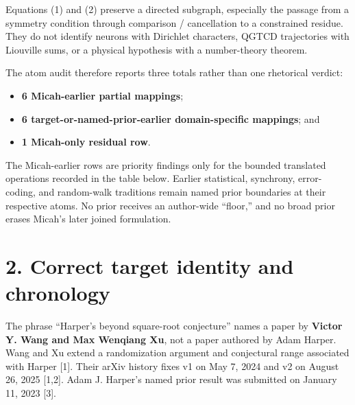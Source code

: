 \documentclass[
  american,
  11pt,
  letterpaper,
]{article}
\providecommand{\tightlist}{%
  \setlength{\itemsep}{0pt}\setlength{\parskip}{0pt}}
\begin{document}
Equations (1) and (2) preserve a directed subgraph, especially the passage from a symmetry condition through comparison / cancellation to a constrained residue. They do not identify neurons with Dirichlet characters, QGTCD trajectories with Liouville sums, or a physical hypothesis with a number-theory theorem.

The atom audit therefore reports three totals rather than one rhetorical verdict:

\begin{itemize}
\tightlist
\item
  \textbf{6 Micah-earlier partial mappings};
\item
  \textbf{6 target-or-named-prior-earlier domain-specific mappings}; and
\item
  \textbf{1 Micah-only residual row}.
\end{itemize}

The Micah-earlier rows are priority findings only for the bounded translated operations recorded in the table below. Earlier statistical, synchrony, error-coding, and random-walk traditions remain named prior boundaries at their respective atoms. No prior receives an author-wide ``floor,'' and no broad prior erases Micah's later joined formulation.

\section{2. Correct target identity and chronology}\label{correct-target-identity-and-chronology}

The phrase ``Harper's beyond square-root conjecture'' names a paper by \textbf{Victor Y. Wang and Max Wenqiang Xu}, not a paper authored by Adam Harper. Wang and Xu extend a randomization argument and conjectural range associated with Harper {[}1{]}. Their arXiv history fixes v1 on May 7, 2024 and v2 on August 26, 2025 {[}1,2{]}. Adam J. Harper's named prior result was submitted on January 11, 2023 {[}3{]}.
\end{document}

